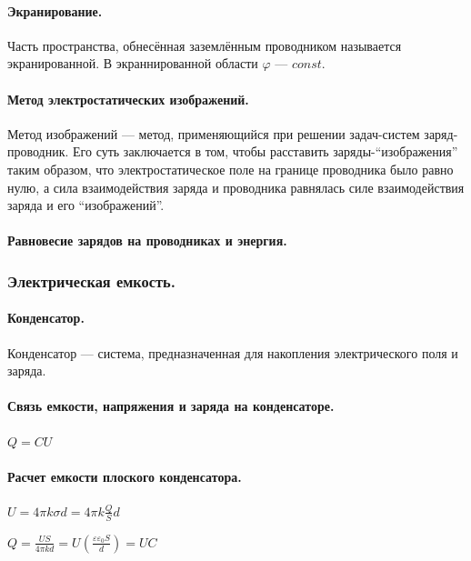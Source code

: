 \documentclass{article}
\begin{document}
            \paragraph{Экранирование.}
                Часть пространства, обнесённая заземлённым проводником называется экранированной. В экраннированной области \(\varphi\) --- \(const\).
            \paragraph{Метод электростатических изображений.}
                Метод изображений --- метод, применяющийся при решении задач-систем заряд-проводник. Его суть заключается в том, чтобы расставить заряды-``изображения'' таким образом, что электростатическое поле на границе проводника было равно нулю, а сила взаимодействия заряда и проводника равнялась силе взаимодействия заряда и его ``изображений''.
            \paragraph{Равновесие зарядов на проводниках и энергия.}
        \subsubsection{Электрическая емкость.}
            \paragraph{Конденсатор.}
                Конденсатор --- система, предназначенная для накопления электрического поля и заряда.
            \paragraph{Связь емкости, напряжения и заряда на конденсаторе.}
                \(Q = CU\)
            \paragraph{Расчет емкости плоского конденсатора.}
                \(U = 4\pi k\sigma d = 4\pi k \frac{Q}{S}d\)

                \(Q = \frac{US}{4\pi kd} = U(\frac{\varepsilon\varepsilon_0 S}{d}) = UC\)
\end{document}

